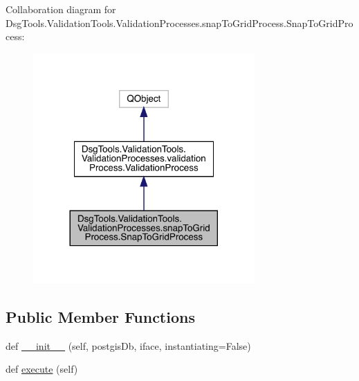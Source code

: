 Collaboration diagram for Dsg\+Tools.\+Validation\+Tools.\+Validation\+Processes.\+snap\+To\+Grid\+Process.\+Snap\+To\+Grid\+Process\+:
\nopagebreak
\begin{figure}[H]
\begin{center}
\leavevmode
\includegraphics[width=240pt]{class_dsg_tools_1_1_validation_tools_1_1_validation_processes_1_1snap_to_grid_process_1_1_snap_to_grid_process__coll__graph}
\end{center}
\end{figure}
\subsection*{Public Member Functions}
\begin{DoxyCompactItemize}
\item 
def \mbox{\hyperlink{class_dsg_tools_1_1_validation_tools_1_1_validation_processes_1_1snap_to_grid_process_1_1_snap_to_grid_process_a62b11c9a2458c29b7089fc06aa10a970}{\+\_\+\+\_\+init\+\_\+\+\_\+}} (self, postgis\+Db, iface, instantiating=False)
\item 
def \mbox{\hyperlink{class_dsg_tools_1_1_validation_tools_1_1_validation_processes_1_1snap_to_grid_process_1_1_snap_to_grid_process_a0984c67151ae11464a62447d22622f64}{execute}} (self)
\end{DoxyCompactItemize}
